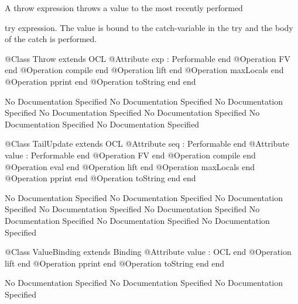       A throw expression throws a value to the most recently performed

      try expression. The value is bound to the catch-variable in the 
      try and the body of the catch is performed.
\begin{Interface}
@Class Throw extends OCL
  @Attribute exp : Performable end
  @Operation FV end
  @Operation compile end
  @Operation lift end
  @Operation maxLocals end
  @Operation pprint end
  @Operation toString end
end
\end{Interface}
No Documentation Specified
No Documentation Specified
No Documentation Specified
No Documentation Specified
No Documentation Specified
No Documentation Specified
No Documentation Specified
\begin{Interface}
@Class TailUpdate extends OCL
  @Attribute seq : Performable end
  @Attribute value : Performable end
  @Operation FV end
  @Operation compile end
  @Operation eval end
  @Operation lift end
  @Operation maxLocals end
  @Operation pprint end
  @Operation toString end
end
\end{Interface}
No Documentation Specified
No Documentation Specified
No Documentation Specified
No Documentation Specified
No Documentation Specified
No Documentation Specified
No Documentation Specified
No Documentation Specified
\begin{Interface}
@Class ValueBinding extends Binding
  @Attribute value : OCL end
  @Operation lift end
  @Operation pprint end
  @Operation toString end
end
\end{Interface}
No Documentation Specified
No Documentation Specified
No Documentation Specified

